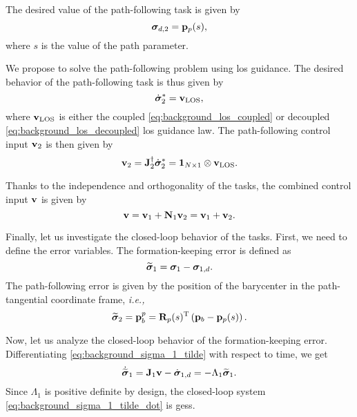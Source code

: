 The desired value of the path-following task is given by
\begin{equation}
    \bm{\sigma}_{d, 2} = \mathbf{p}_p(s),
\end{equation}
where $s$ is the value of the path parameter.

We propose to solve the path-following problem using \acrlong{los} guidance.
The desired behavior of the path-following task is thus given by
\begin{equation}
    \dot{\bm{\sigma}}_2^{*} = \mathbf{v}_{\rm LOS},
\end{equation}
where $\mathbf{v}_{\rm LOS}$ is either the coupled \eqref{eq:background_los_coupled} or decoupled \eqref{eq:background_los_decoupled} \gls{los} guidance law.
The path-following control input $\mathbf{v}_2$ is then given by
\begin{equation}
    \mathbf{v}_2 = \mathbf{J}_2^{\dagger} \dot{\bm{\sigma}}_2^{*} = \mathbf{1}_{N \times 1} \otimes \mathbf{v}_{\rm LOS}.
\end{equation}

Thanks to the independence and orthogonality of the tasks, the combined control input $\mathbf{v}$ is given by
\begin{equation}
    \mathbf{v} = \mathbf{v}_1 + \mathbf{N}_1 \mathbf{v}_2 = \mathbf{v}_1 + \mathbf{v}_2.
\end{equation}

Finally, let us investigate the closed-loop behavior of the tasks.
First, we need to define the error variables.
The formation-keeping error is defined as
\begin{equation}
    \widetilde{\bm{\sigma}}_1 = \bm{\sigma}_1 - \bm{\sigma}_{1, d}.
    \label{eq:background_sigma_1_tilde}
\end{equation}
The path-following error is given by the position of the barycenter in the path-tangential coordinate frame, \emph{i.e.,}
\begin{equation}
    \widetilde{\bm{\sigma}}_2 = \mathbf{p}_b^p = \mathbf{R}_p(s)^{\mathrm{T}} \left(\mathbf{p}_b - \mathbf{p}_p(s)\right).
    \label{eq:background_sigma_2_tilde}
\end{equation}

Now, let us analyze the closed-loop behavior of the formation-keeping error.
Differentiating \eqref{eq:background_sigma_1_tilde} with respect to time, we get
\begin{equation}
    \dot{\widetilde{\bm{\sigma}}}_1 = \mathbf{J}_1 \mathbf{v} - \dot{\bm{\sigma}}_{1, d} = - \Lambda_1 \widetilde{\bm{\sigma}}_1.
    \label{eq:background_sigma_1_tilde_dot}
\end{equation}
Since $\Lambda_1$ is positive definite by design, the closed-loop system \eqref{eq:background_sigma_1_tilde_dot} is \glspl{ges}.


